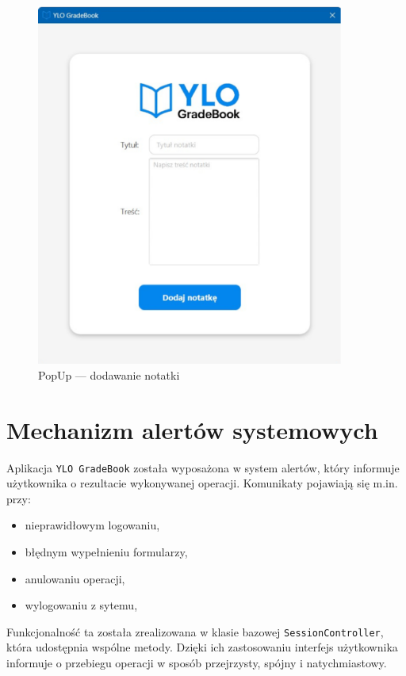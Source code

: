 \begin{figure}[H]
    \centering
    \includegraphics[width=0.9\textwidth]{figures/fig_0019.eps}
    \caption{PopUp — dodawanie notatki}
    \label{fig:popUpNote}
\end{figure}
\newpage
\section{Mechanizm alertów systemowych}

Aplikacja \texttt{YLO GradeBook} została wyposażona w system alertów, który informuje użytkownika o rezultacie wykonywanej operacji. Komunikaty pojawiają się m.in. przy:

\begin{itemize}
    \item nieprawidłowym logowaniu,
    \item błędnym wypełnieniu formularzy,
    \item anulowaniu operacji,
    \item wylogowaniu z sytemu,
\end{itemize}

Funkcjonalność ta została zrealizowana w klasie bazowej \texttt{SessionController}, która udostępnia wspólne metody. Dzięki ich zastosowaniu interfejs użytkownika informuje o przebiegu operacji w sposób przejrzysty, spójny i natychmiastowy.

